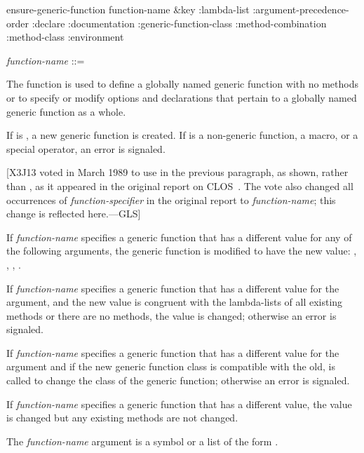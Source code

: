 \begin{defun}[Function]
ensure-generic-function function-name &key :lambda-list
:argument-precedence-order
:declare
:documentation
:generic-function-class
:method-combination
:method-class
:environment

\begin{tabbing}
\emph{function-name} ::= 
\end{tabbing}
The function  is used to define a
globally named generic function with no methods or to specify or
modify options and declarations that pertain to a globally named
generic function as a whole.

If  is , a new
generic function is created.  If  is a
non-generic function, a macro, or a 
special operator, an error is signaled.

[X3J13 voted in March 1989  to use 
in the previous paragraph, as shown, rather than ,
as it appeared in the original report on CLOS~\cite{SIGPLAN-CLOS,LASC-CLOS-PART-2}.
The vote also changed all occurrences of \emph{function-specifier} in the
original report to \emph{function-name}; this change is reflected here.---GLS]

If \emph{function-name} specifies a generic function that has a
different value for any of the following arguments, the generic
function is modified to have the new value: 
, , ,
.

If \emph{function-name} specifies a generic function that has a
different value for the  argument, and the new value
is congruent with the lambda-lists of all existing methods or there
are no methods, the value is changed; otherwise an error is signaled.

If \emph{function-name} specifies a generic function that has a
different value for the  argument and if
the new generic function class is compatible with the old, 
 is called to change the class of the generic function;
otherwise an error is signaled.

If \emph{function-name} specifies a generic function that has a
different  value, the value is
changed but any existing methods are not changed.

The \emph{function-name} argument is a symbol or a list of the
form .


\end{defun}
